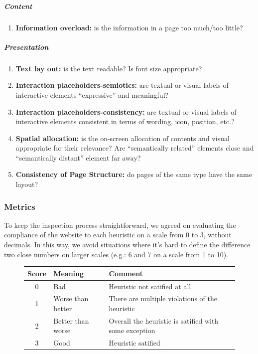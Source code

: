 \subparagraph*{Content}

\begin{enumerate}[start=1,label={-- \bf MC\arabic{*}}]
    \item \textbf{Information overload:} is the information in a page too much/too
          little?
\end{enumerate}

\subparagraph*{Presentation}

\begin{enumerate}[start=1,label={-- \bf MP\arabic{*}}]
    \item \textbf{Text lay out:} is the text readable? Is font size appropriate?
    \item \textbf{Interaction placeholders-semiotics:} are textual or visual    
          labels of interactive elements ``expressive'' and meaningful?
    \item \textbf{Interaction placeholders-consistency:} are textual or visual 
          labels of interactive elements consistent in terms of wording, icon, 
          position, etc.?
    \item \textbf{Spatial allocation:} is the on-screen allocation of contents 
          and visual appropriate for their relevance? Are ``semantically 
          related'' elements close and ``semantically distant'' element far 
          away?
    \item \textbf{Consistency of Page Structure:} do pages of the same type 
          have the same layout?
\end{enumerate}

\subsubsection{Metrics}

To keep the inspection process straightforward, we agreed on evaluating the compliance of the website to each heuristic on a scale from 0 to 3, without decimals. In this way, we avoid situations where it's hard to define the difference two close numbers on larger scales (e.g.: 6 and 7 on a scale from 1 to 10).

\begin{figure}[h]
    \begin{tabular}{c l l}
        \toprule
        \textbf{Score} & \textbf{Meaning} & \textbf{Comment} \\
        \midrule
        0 & Bad & Heuristic not satified at all \\
        1 & Worse than better & There are multiple violations of the heuristic \\
        2 & Better than worse & Overall the heuristic is satified with some  exception \\
        3 & Good & Heuristic satified\\
        \bottomrule
    \end{tabular}
\end{figure}

